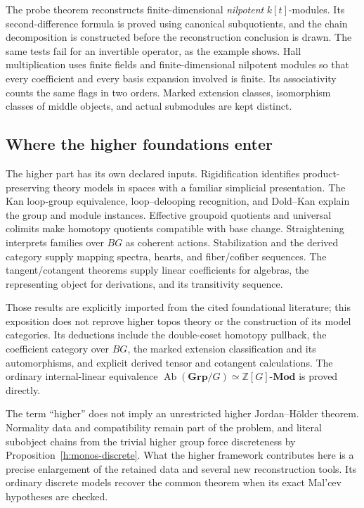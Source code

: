 \documentclass[11pt]{article}
\theoremstyle{definition}
\theoremstyle{remark}\newtheorem{remark}[theorem]{Remark}
\begin{document}
The probe theorem reconstructs finite-dimensional \emph{nilpotent}
$k[t]$-modules. Its second-difference formula is proved using canonical
subquotients, and the chain decomposition is constructed before the
reconstruction conclusion is drawn. The same tests fail for an invertible
operator, as the example shows. Hall multiplication uses finite fields
and finite-dimensional nilpotent modules so that every coefficient and
every basis expansion involved is finite. Its associativity counts the
same flags in two orders. Marked extension classes, isomorphism classes
of middle objects, and actual submodules are kept distinct.

\subsection{Where the higher foundations enter}

The higher part has its own declared inputs. Rigidification identifies
product-preserving theory models in spaces with a familiar simplicial
presentation. The Kan loop-group equivalence, loop--delooping recognition,
and Dold--Kan explain the group and module
instances. Effective groupoid quotients and universal colimits make
homotopy quotients compatible with base change. Straightening interprets
families over $BG$ as coherent actions. Stabilization and the derived
category supply mapping spectra, hearts, and fiber/cofiber sequences.
The tangent/cotangent theorems supply linear coefficients for algebras,
the representing object for derivations, and its transitivity sequence.

Those results are explicitly imported from the cited foundational
literature; this exposition does not reprove higher topos theory or the
construction of its model categories. Its deductions include the
double-coset homotopy pullback, the coefficient category over $BG$, the
marked extension classification and its automorphisms, and explicit
derived tensor and cotangent calculations. The ordinary internal-linear
equivalence $\operatorname{Ab}(\mathbf{Grp}/G)\simeq
\mathbb Z[G]\text{-}\mathbf{Mod}$ is proved directly.

The term ``higher'' does not imply an unrestricted higher
Jordan--H\"older theorem. Normality data and compatibility remain part of
the problem, and literal subobject chains from the trivial higher group
force discreteness by Proposition~\ref{h:monos-discrete}. What the higher
framework contributes here is a precise enlargement of the retained data
and several new reconstruction tools. Its ordinary discrete models
recover the common theorem when its exact Mal'cev hypotheses are checked.
\end{document}
